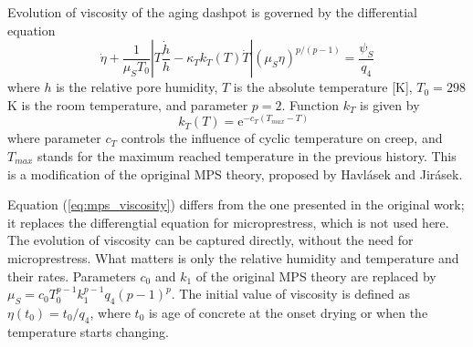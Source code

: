 \documentclass[a4paper]{article}
\begin{document}
Evolution of viscosity of the aging dashpot is governed by the differential
equation 
\begin{equation}
\label{eq:mps_viscosity}
\dot{\eta}+\frac{1}{\mu_S T_0} \left |  T \frac{\dot{h}}{h} - \kappa_T k_T(T) \dot{T}  \right | \left( \mu_S \eta \right)^{p/\left(p-1\right)} = \frac{\psi_S}{q_4}
\end{equation}
where $h$ is the relative pore humidity, $T$ is the absolute temperature [K], $T_0 = 298$ K is the room temperature,  and parameter $p = 2$. 
Function $k_T$ is given by 
\begin{equation}
\quad k_T(T) = \mbox{e}^{-c_T \left (T_{max}-T\right )}
\label{eq:mps_k_T}
\end{equation}
where parameter $c_T$ controls the influence of cyclic temperature on creep, and $T_{max}$ stands for the maximum reached temperature in the previous history. 
This is a modification of the opriginal MPS theory, proposed by Havl\'{a}sek and Jir\'{a}sek. 


Equation (\ref{eq:mps_viscosity}) differs from the one presented in the original work; it replaces the differengtial equation for microprestress, which is not used here. The evolution of viscosity can be captured directly, without the need for microprestress. What matters is only the relative humidity and temperature and their rates. Parameters $c_0$ and $k_1$ of the original MPS theory
are replaced by $\mu_S = c_0 T_0^{p-1} k_1^{p-1} q_4 (p-1)^p$. 
The initial value of viscosity is defined as $\eta(t_0) = t_0/q_4$, where $t_0$ is age of concrete at the onset drying or when the temperature starts changing.
\end{document}
